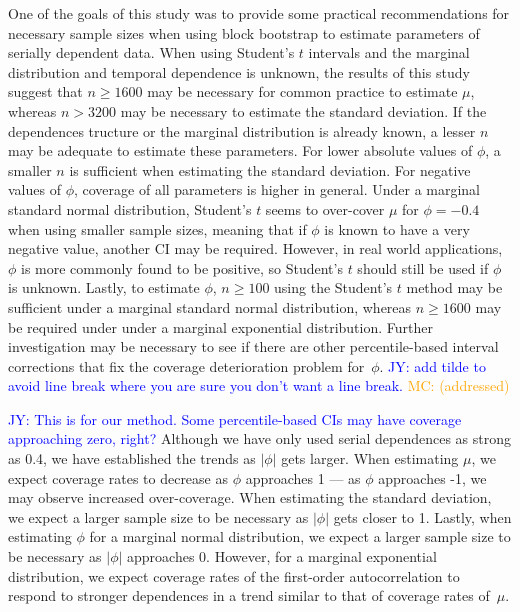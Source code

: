 \documentclass[10pt]{article}
\newcommand{\jy}[1]{\textcolor{blue}{JY: #1}}
\newcommand{\mc}[1]{\textcolor{orange}{MC: (#1)}}
\begin{document}
One of the goals of this study was to provide some practical recommendations for 
necessary sample sizes when using block bootstrap to estimate parameters of 
serially dependent data. When using Student's $t$ intervals and the marginal
distribution and temporal dependence is 
unknown, the results of this study suggest that $n \geq 1600$ may be necessary 
for common practice to estimate $\mu$, whereas $n > 3200$ may be necessary
to estimate the standard deviation. If 
the dependences tructure or the marginal distribution is already known, a 
lesser $n$ may be 
adequate to estimate these 
parameters. For lower absolute values of $\phi$, a smaller $n$ is sufficient 
when estimating the standard deviation. For negative values of $\phi$, coverage of all 
parameters is higher in general. Under a marginal standard normal distribution, 
Student's $t$ seems to over-cover 
$\mu$ for $\phi = - 0.4$  when 
using smaller sample sizes, meaning that if $\phi$ 
is known to have a very negative value, another CI may be required. However, in 
real world applications, $\phi$ is more commonly found to be positive, so 
Student's $t$ should still be used if $\phi$ is unknown. 
Lastly, to estimate 
$\phi$, $n \geq 100$ using the Student's $t$ method may be sufficient under
a marginal standard normal distribution, whereas $n \geq 1600$ may be required
under under a marginal exponential distribution. Further
investigation may be necessary to see if there are other percentile-based 
interval corrections
that fix the coverage deterioration problem for~$\phi$.
\jy{add tilde to avoid line break where you are sure you don't want a
  line break.}
\mc{addressed}


\jy{This is for our method. Some percentile-based CIs may have coverage
  approaching zero, right?}
Although
we have only used serial dependences as strong as 0.4, we have established the 
trends as $|\phi|$ gets larger. When estimating $\mu$, we expect coverage rates 
to decrease as
$\phi$ approaches 1 --- as $\phi$ approaches -1, we may observe increased 
over-coverage. When estimating the standard deviation, we expect a larger sample 
size to
be necessary as $|\phi|$ gets closer to 1. Lastly, when estimating $\phi$ for
a marginal normal distribution, we 
expect a larger sample size to be necessary as $|\phi|$ approaches 0. However, 
for a marginal exponential distribution, we expect coverage rates of the 
first-order autocorrelation to 
respond
to stronger dependences in a trend similar to that of coverage rates of~$\mu$.
\end{document}
